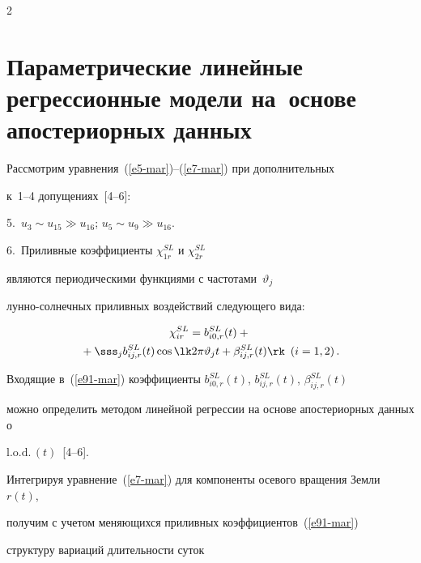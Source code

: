 \begin{multicols}{2}
\section{Параметрические линейные регрессионные модели на~основе апостериорных данных}





Рассмотрим уравнения~(\ref{e5-mar})--(\ref{e7-mar}) при дополнительных 


к~1--4 допущениях~[4--6]:





\smallskip





5.\ $u_3\sim u_{15} \gg u_{16}$; $u_5\sim u_9 \gg u_{16}$.





\smallskip





6.\ Приливные коэффициенты $\chi_{1r}^{SL}$ и $\chi_{2r}^{SL}$


являются периодическими функциями с час\-то\-та\-ми~$\vartheta_j$


лун\-но-сол\-неч\-ных приливных воздействий сле\-ду\-юще\-го вида:


\begin{multline}


\chi_{ir}^{SL} = b_{i0,r}^{SL} (t) +{}\\


{}+\sss_{j} b_{ij,r}^{SL} (t) 


\cos \lk 2\pi \vartheta_j t + \beta_{ij,r}^{SL} (t)\rk \enskip (i=1,2)\,.\label{e91-mar}


\end{multline}


Входящие в~(\ref{e91-mar}) коэффициенты $b_{i0,r}^{SL}(t)$, $b_{ij,r}^{SL} (t)$, $\beta_{ij,r}^{SL} (t)$ 


можно определить методом линейной регрессии на основе апостериорных данных о 


$\mathrm{l.o.d.}\,(t)$~[4--6].





Интегрируя уравнение~(\ref{e7-mar}) для компоненты осевого вращения Земли~$r(t)$, 


получим с учетом меняющихся приливных коэффициентов~(\ref{e91-mar}) 


структуру вариаций длительности суток



\end{multicols}

